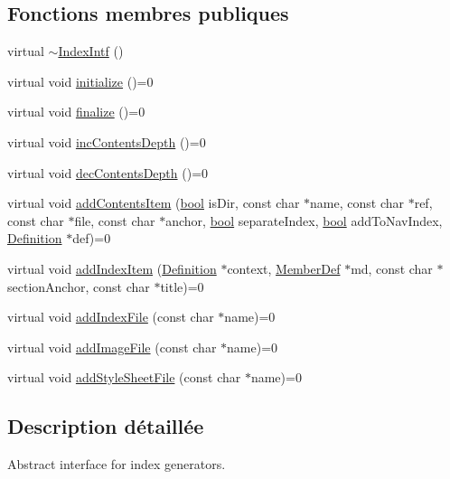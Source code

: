 \subsection*{Fonctions membres publiques}
\begin{DoxyCompactItemize}
\item 
virtual \hyperlink{class_index_intf_aa97a03b1de6ccb0d35b33cbf44d69f2a}{$\sim$\+Index\+Intf} ()
\item 
virtual void \hyperlink{class_index_intf_a0e46b4afa0ed269e2d089c8444590515}{initialize} ()=0
\item 
virtual void \hyperlink{class_index_intf_aa5532a767c4ac41167d014209b2ea8d7}{finalize} ()=0
\item 
virtual void \hyperlink{class_index_intf_ac5ff1647bcf1cc65543258df162a0a7c}{inc\+Contents\+Depth} ()=0
\item 
virtual void \hyperlink{class_index_intf_a920918399556e9afd4d927de3d1f4247}{dec\+Contents\+Depth} ()=0
\item 
virtual void \hyperlink{class_index_intf_aab43652b639ce5cd25f5b16e54e20f26}{add\+Contents\+Item} (\hyperlink{qglobal_8h_a1062901a7428fdd9c7f180f5e01ea056}{bool} is\+Dir, const char $\ast$name, const char $\ast$ref, const char $\ast$file, const char $\ast$anchor, \hyperlink{qglobal_8h_a1062901a7428fdd9c7f180f5e01ea056}{bool} separate\+Index, \hyperlink{qglobal_8h_a1062901a7428fdd9c7f180f5e01ea056}{bool} add\+To\+Nav\+Index, \hyperlink{class_definition}{Definition} $\ast$def)=0
\item 
virtual void \hyperlink{class_index_intf_a762276e6f0229fb784a592acd2cf6a8b}{add\+Index\+Item} (\hyperlink{class_definition}{Definition} $\ast$context, \hyperlink{class_member_def}{Member\+Def} $\ast$md, const char $\ast$section\+Anchor, const char $\ast$title)=0
\item 
virtual void \hyperlink{class_index_intf_a153c5c5995155d112c33fed544b44094}{add\+Index\+File} (const char $\ast$name)=0
\item 
virtual void \hyperlink{class_index_intf_ac1650d4596d97cdd1de428b06a76daad}{add\+Image\+File} (const char $\ast$name)=0
\item 
virtual void \hyperlink{class_index_intf_a3989fce1306feb90e477cb53fd0daee0}{add\+Style\+Sheet\+File} (const char $\ast$name)=0
\end{DoxyCompactItemize}


\subsection{Description détaillée}
Abstract interface for index generators. 

